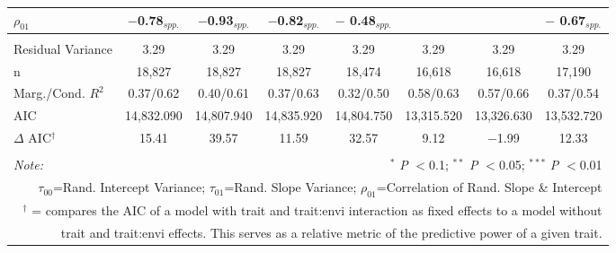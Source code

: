 \documentclass[12pt, letterpaper]{article}
\begin{document}
\begin{table}[h]
{\begin{tabular}{lccccccc}
  $\rho_{01}$ & $-$0.78$_{spp.}$ & $-$0.93$_{spp.}$ & $-$0.82$_{spp.}$ & $-$ 0.48$_{spp.}$ & & & $-$ 0.67$_{spp.}$ \\
\hline \\[-1.8ex] 
\rowcolor[gray]{.95} Residual Variance & 3.29 & 3.29 & 3.29 & 3.29 & 3.29 & 3.29 & 3.29\\
n & 18,827 & 18,827 & 18,827 & 18,474 & 16,618 & 16,618 & 17,190\\ 
\rowcolor[gray]{.95} Marg./Cond. $R^2$ & 0.37/0.62 & 0.40/0.61 & 0.37/0.63 & 0.32/0.50 & 0.58/0.63 & 0.57/0.66 & 0.37/0.54 \\
AIC   & 14,832.090 & 14,807.940 & 14,835.920 & 14,804.750 & 13,315.520 & 13,326.630 & 13,532.720 \\ 
\hline 
\rowcolor[gray]{.95}$\Delta$ AIC$^\dagger$  & 15.41 & 39.57 & 11.59 & 32.57 & 9.12 & $-$1.99 & 12.33 \\
\hline 
\hline \\[-1.8ex] 
\textit{Note:}  & \multicolumn{7}{r}{$^{*}$ \textit{P} $<$0.1; $^{**}$ \textit{P} $<$0.05; $^{***}$ \textit{P} $<$0.01}\\
\multicolumn{8}{r}{$\tau_{00}$=Rand. Intercept Variance; $\tau_{01}$=Rand. Slope Variance; $\rho_{01}$=Correlation of Rand. Slope \& Intercept}\\ 
\multicolumn{8}{r}{$^\dagger$ = compares the AIC of a model with trait and trait:envi interaction as fixed effects to a model without}\\
\multicolumn{8}{r}{trait and trait:envi effects. This serves as a relative metric of the predictive power of a given trait.}
\end{tabular}} 
\end{table} 
\end{document}
